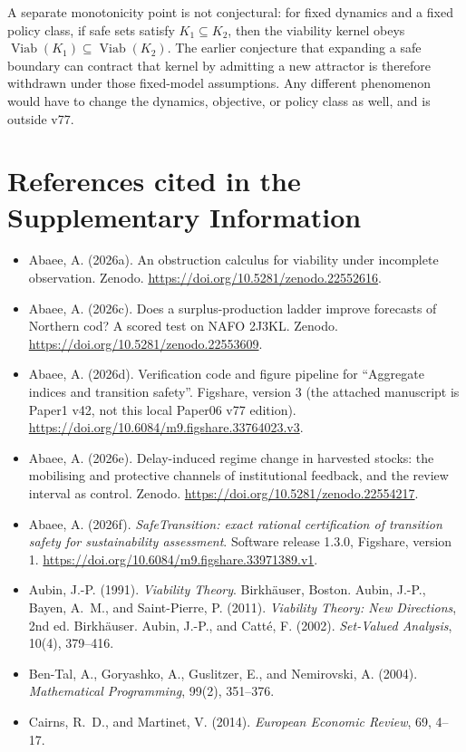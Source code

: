 A separate monotonicity point is not conjectural: for fixed dynamics and a fixed policy class, if safe sets satisfy $K_1\subseteq K_2$, then the viability kernel obeys $\operatorname{Viab}(K_1)\subseteq\operatorname{Viab}(K_2)$. The earlier conjecture that expanding a safe boundary can contract that kernel by admitting a new attractor is therefore withdrawn under those fixed-model assumptions. Any different phenomenon would have to change the dynamics, objective, or policy class as well, and is outside v77.

\section*{References cited in the Supplementary Information}
\begin{itemize}[leftmargin=1.5em,itemsep=1pt]
\item Abaee, A. (2026a). An obstruction calculus for viability under incomplete observation. Zenodo. \url{https://doi.org/10.5281/zenodo.22552616}.
\item Abaee, A. (2026c). Does a surplus-production ladder improve forecasts of Northern cod? A scored test on NAFO 2J3KL. Zenodo. \url{https://doi.org/10.5281/zenodo.22553609}.
\item Abaee, A. (2026d). Verification code and figure pipeline for ``Aggregate indices and transition safety''. Figshare, version 3 (the attached manuscript is Paper1 v42, not this local Paper06 v77 edition). \url{https://doi.org/10.6084/m9.figshare.33764023.v3}.
\item Abaee, A. (2026e). Delay-induced regime change in harvested stocks: the mobilising and protective channels of institutional feedback, and the review interval as control. Zenodo. \url{https://doi.org/10.5281/zenodo.22554217}.
\item Abaee, A. (2026f). \emph{SafeTransition: exact rational certification of transition safety for sustainability assessment}. Software release 1.3.0, Figshare, version 1. \url{https://doi.org/10.6084/m9.figshare.33971389.v1}.
\item Aubin, J.-P. (1991). \emph{Viability Theory}. Birkh\"auser, Boston. Aubin, J.-P., Bayen, A.~M., and Saint-Pierre, P. (2011). \emph{Viability Theory: New Directions}, 2nd ed. Birkh\"auser. Aubin, J.-P., and Catt\'e, F. (2002). \emph{Set-Valued Analysis}, 10(4), 379--416.
\item Ben-Tal, A., Goryashko, A., Guslitzer, E., and Nemirovski, A. (2004). \emph{Mathematical Programming}, 99(2), 351--376.
\item Cairns, R.~D., and Martinet, V. (2014). \emph{European Economic Review}, 69, 4--17.

\end{itemize}
